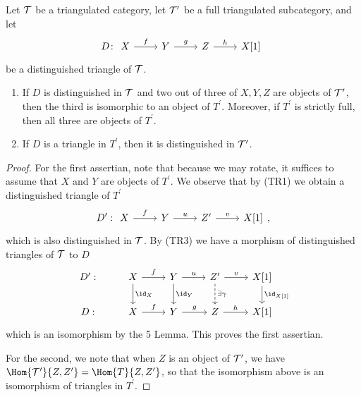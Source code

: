 \documentclass[10pt]{amsart}
\begin{document}
\begin{prop}\label{fulltriangles}
  Let $\mathcal{T}$ be a triangulated category, let $\mathcal{T}^\prime$ be a full triangulated subcategory, and let 
  $$D\colon 
  \begin{tikzcd}
    X \arrow{r}{f} & Y \arrow{r}{g} & Z \arrow{r}{h} & X[1] 
  \end{tikzcd}$$
  be a distinguished triangle of $\mathcal{T}$.
  \begin{enumerate}
  \item
    If $D$ is distinguished in $\mathcal{T}$ and two out of three of $X,Y,Z$ are objects of $\mathcal{T}^\prime$, then the third is isomorphic to an object of $T^\prime$.
    Moreover, if $T^\prime$ is strictly full, then all three are objects of $T^\prime$.
  \item
    If $D$ is a triangle in $T^\prime$, then it is distinguished in $\mathcal{T}^\prime$.
  \end{enumerate}

  \begin{proof}
    For the first assertian, note that because we may rotate, it suffices to assume that $X$ and $Y$ are objects of $T^\prime$.
    We observe that by (TR1) we obtain a distinguished triangle of $T^\prime$ 
    $$D^\prime : 
    \begin{tikzcd}
      X \arrow{r}{f} & Y\arrow{r}{u} & Z^\prime \arrow{r}{v} & X[1]
    \end{tikzcd},$$
    which is also distinguished in $\mathcal{T}$.
    By (TR3) we have a morphism of distinguished triangles of $\mathcal{T}$ to $D$
    $$\begin{tikzcd}
      D^\prime: & X \arrow{d}{\id_X}\arrow{r}{f} & Y \arrow{d}{\id_Y}\arrow{r}{u} & Z^\prime \arrow[dashed]{d}{\exists \gamma}\arrow{r}{v} & X[1]\arrow{d}{\id_{X[1]}}\\
      D: & X \arrow{r}{f} & Y \arrow{r}{g} & Z \arrow{r}{h} & X[1]
    \end{tikzcd}$$
    which is an isomorphism by the 5 Lemma.
    This proves the first assertian.
    
    For the second, we note that when $Z$ is an object of $\mathcal{T}^\prime$, we have $\Hom{\T^\prime}{Z,Z^\prime} = \Hom{T}{Z,Z^\prime}$, so that the isomorphism above is an isomorphism of triangles in $T^\prime$.
  \end{proof}
\end{prop}
\end{document}
